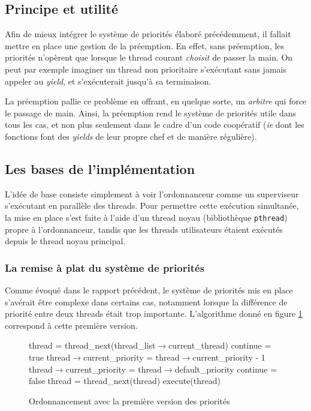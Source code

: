 \documentclass[a4paper,11pt]{article}
\begin{document}
\subsection{Principe et utilité}

Afin de mieux intégrer le système de priorités élaboré précédemment, il fallait mettre en place une gestion de la préemption. En effet, sans préemption, les priorités n'opèrent que lorsque le thread courant \textit{choisit} de passer la main. On peut par exemple imaginer un thread non prioritaire s'exécutant sans jamais appeler au \textit{yield}, et s'exécuterait jusqu'à sa terminaison.

La préemption pallie ce problème en offrant, en quelque sorte, un \textit{arbitre} qui force le passage de main. Ainsi, la préemption rend le système de priorités utile dans tous les cas, et non plus seulement dans le cadre d'un code coopératif (\textit{ie} dont les fonctions font des \textit{yields} de leur propre chef et de manière régulière).

\subsection{Les bases de l'implémentation}

L'idée de base consiste simplement à voir l'ordonnanceur comme un superviseur s'exécutant en parallèle des threads. Pour permettre cette exécution simultanée, la mise en place s'est faite à l'aide d'un thread noyau (bibliothèque \texttt{pthread}) propre à l'ordonnanceur, tandis que les threads utilisateurs étaient exécutés depuis le thread noyau principal.

\subsubsection*{La remise à plat du système de priorités}

Comme évoqué dans le rapport précédent, le système de priorités mis en place s'avérait être complexe dans certains cas, notamment lorsque la différence de priorité entre deux threads était trop importante. L'algorithme donné en figure \ref{priority1} correspond à cette première version.

\begin{figure}[H]
\begin{algorithm}[H]
 thread = thread\_next(thread\_list$\rightarrow$current\_thread)\;
 continue = true\;
  {
 	thread$\rightarrow$current\_priority = thread$\rightarrow$current\_priority - 1\;
 	 {
 			thread$\rightarrow$current\_priority = thread$\rightarrow$default\_priority\;
 		}
 	 {
 		continue = false\;
 	}{
 	thread = thread\_next(thread)\;
 	}
  }
  execute(thread)\;
\end{algorithm}
\caption{Ordonnancement avec la première version des priorités}
\label{priority1}
\end{figure}
\end{document}

